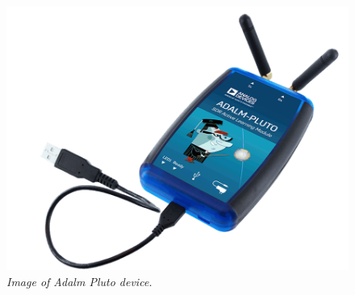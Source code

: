 \documentclass[en,printmode]{mgr}
\begin{document}
			\begin{figure}[!htb]
    			\centering
   				\includegraphics[width=\textwidth]{images/plutoimg.png}
    			\caption{\textit{Image of Adalm Pluto device.}}
			\end{figure}
			\newpage
\end{document}
